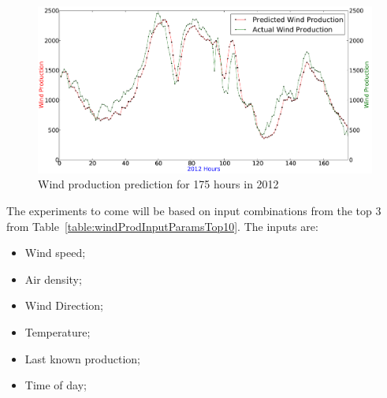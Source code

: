 \begin{figure}[H]
\centering
\includegraphics[width=0.99\linewidth]{billeder/bestInputParameterPrediction.png}
\caption{Wind production prediction for 175 hours in 2012}
\label{fig:bestInputParameterPrediction}
\end{figure}   

The experiments to come will be based on input combinations from the top 3 from Table~\ref{table:windProdInputParamsTop10}. The inputs are:
\begin{itemize}
\item Wind speed;
\item Air density;
\item Wind Direction;
\item Temperature;
\item Last known production;
\item Time of day;
\end{itemize}


